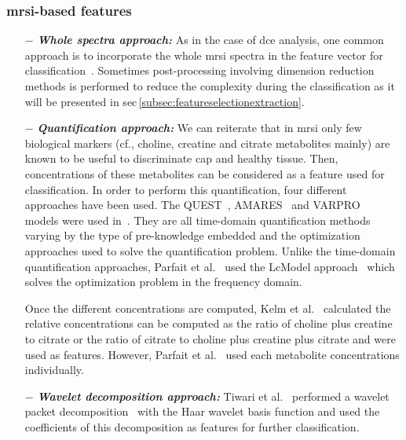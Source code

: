 \subsubsection{\ac{mrsi}-based features}

\begin{enumerate}[leftmargin=*]

\item[$-$] \textbf{\textit{Whole spectra approach:}} As in the case of \ac{dce} analysis, one common approach is to incorporate the whole \ac{mrsi} spectra in the feature vector for classification~\cite{Kelm2007,Parfait2012,Tiwari2007,Tiwari2009,Tiwari2013,Tiwari2009a,Tiwari2010,Viswanath2008a,Matulewicz2013}. Sometimes post-processing involving dimension reduction methods is performed to reduce the complexity during the classification as it will be presented in \ac{sec}\,\ref{subsec:featureselectionextraction}.

\item[$-$] \textbf{\textit{Quantification approach:}} We can reiterate that in \ac{mrsi} only few biological markers (cf., choline, creatine and citrate metabolites mainly) are known to be useful to discriminate \ac{cap} and healthy tissue. Then, concentrations of these metabolites can be considered as a feature used for classification. In order to perform this quantification, four different approaches have been used. The QUEST~\cite{Ratiney2005}, AMARES~\cite{Vanhamme1997} and VARPRO~\cite{Coleman1993} models were used in~\cite{Kelm2007}. They are all time-domain quantification methods varying by the type of pre-knowledge embedded and the optimization approaches used to solve the quantification problem. Unlike the time-domain quantification approaches, Parfait et al.~\cite{Parfait2012} used the LcModel approach~\cite{Provencher1993} which solves the optimization problem in the frequency domain.

  Once the different concentrations are computed, Kelm et al.~\cite{Kelm2007} calculated the relative concentrations can be computed as the ratio of choline plus creatine to citrate or the ratio of citrate to choline plus creatine plus citrate and were used as features. However, Parfait et al.~\cite{Parfait2012} used each metabolite concentrations individually.

\item[$-$] \textbf{\textit{Wavelet decomposition approach:}} Tiwari et al.~\cite{Tiwari2012} performed a wavelet packet decomposition~\cite{Coifman1992} with the Haar wavelet basis function and used the coefficients of this decomposition as features for further classification.

\end{enumerate}

